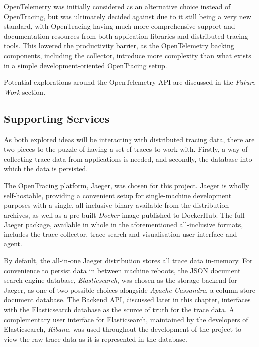 \documentclass[12pt,pdftex,titlepage]{report}
\begin{document}
                OpenTelemetry was initially considered as an alternative choice instead of OpenTracing, but was ultimately decided against due to it still being a very new
                standard, with OpenTracing having much more comprehensive support and documentation resources from both application libraries and distributed tracing tools.
                This lowered the productivity barrier, as the OpenTelemetry backing components, including the collector, introduce more complexity than what exists in a simple
                development-oriented OpenTracing setup.

                Potential explorations around the OpenTelemetry API are discussed in the \textit{Future Work} section.

            \subsection{Supporting Services}
                As both explored ideas will be interacting with distributed tracing data, there are two pieces to the puzzle of having a set of traces to work with.
                Firstly, a way of collecting trace data from applications is needed, and secondly, the database into which the data is persisted.
                
                The OpenTracing platform, Jaeger, was chosen for this project. Jaeger is wholly self-hostable, providing a convenient setup for single-machine development purposes with
                a single, all-inclusive binary available from the distribution archives, as well as a pre-built \textit{Docker} image published to DockerHub. The full Jaeger package,
                available in whole in the aforementioned all-inclusive formats, includes the trace collector, trace search and visualisation user interface and agent.

                By default, the all-in-one Jaeger distribution stores all trace data in-memory. For convenience to persist data in between machine reboots, the JSON document search engine
                database, \textit{Elasticsearch}, was chosen as the storage backend for Jaeger, as one of two possible choices alongside \textit{Apache Cassandra}, a column store document
                database. The Backend API, discussed later in this chapter, interfaces with the Elasticsearch database as the source of truth for the trace data. A complementary user interface
                for Elasticsearch, maintained by the developers of Elasticsearch, \textit{Kibana}, was used throughout the development of the project to view the raw trace data as it is 
                represented in the database.
\end{document}
